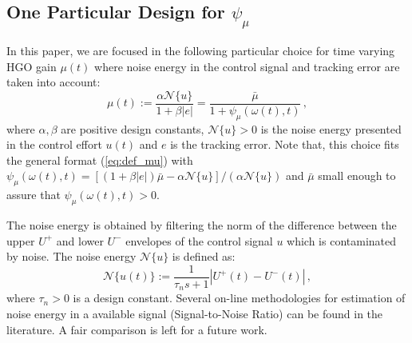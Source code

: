 \documentclass[letterpaper, 10 pt, conference]{ieeeconf}  %
\theoremstyle{plain}
\theoremstyle{definition}
\theoremstyle{remark}
\begin{document}
\subsection{One Particular Design for $\psi_\mu$}
%
%

In this paper, we are focused in the following particular choice for time varying HGO gain $\mu(t)$ where noise energy in the control signal and tracking error are taken into account: 
%
\begin{equation}
\mu(t):=\frac{\alpha \mathcal{N}\{u\}}{1+\beta |e|}=\frac{\bar{\mu}}{1+
\psi_\mu(\omega(t),t)}\,,\label{eq:def_mupratico}
\end{equation}
%
where $\alpha,\beta$ are positive design constants, $\mathcal{N}\{u\}>0$ is the noise energy presented in the control effort $u(t)$ and $e$ is the tracking error. Note that, this choice fits the general format (\ref{eq:def_mu}) with $\psi_\mu(\omega(t),t)=[(1+\beta |e|) \bar{\mu}-\alpha \mathcal{N}\{u\}]/(\alpha \mathcal{N}\{u\})$ and $\bar{\mu}$ small enough to assure that  $\psi_\mu(\omega(t),t)>0$. 

The noise energy is obtained by filtering the norm of the difference between 
the upper $U^{+}$ and lower $U^{-}$ envelopes of the control signal $u$ which is contaminated by noise. The noise energy $\mathcal{N}\{u\}$ is defined as:
%
%
$$\mathcal{N}\{u(t)\}:=\frac{1}{\tau_n s +1} \left|U^{+}(t)-U^{-}(t)\right|\,,$$
%
where $\tau_n>0$ is a design constant. Several  on-line methodologies for estimation of noise energy in a available signal (Signal-to-Noise Ratio) can be found in the literature. A fair comparison is left for a future work.  
\end{document}
